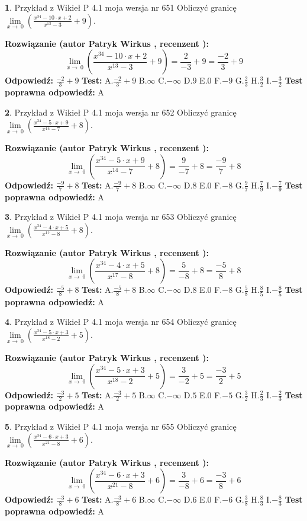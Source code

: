 \documentclass[12pt, a4paper]{article}
\theoremstyle{definition} %
\newtheorem{zad}{}
\newcommand{\zadStart}[1]{\begin{zad}#1\newline}
\newcommand{\zadStop}{\end{zad}}
\newcommand{\rozwStart}[2]{\noindent \textbf{Rozwiązanie (autor #1 , recenzent #2): }\newline}
\newcommand{\rozwStop}{\newline}
\newcommand{\odpStart}{\noindent \textbf{Odpowiedź:}\newline}
\newcommand{\odpStop}{\newline}
\newcommand{\testStart}{\noindent \textbf{Test:}\newline}
\newcommand{\testStop}{\newline}
\newcommand{\kluczStart}{\noindent \textbf{Test poprawna odpowiedź:}\newline}
\newcommand{\kluczStop}{\newline}
\begin{document}
\zadStart{Przykład z Wikieł P 4.1 moja wersja nr 651}
Obliczyć granicę $\lim\limits_{x\to\ 0}(\frac{x^{34}-10 \cdot x +2}{x^{13}-3}+9)$.
\zadStop
\rozwStart{Patryk Wirkus}{}
$$\lim\limits_{x\to\ 0}(\frac{x^{34}-10 \cdot x +2}{x^{13}-3}+9)=\frac{2}{-3}+9=\frac{-2}{3}+9$$
\rozwStop
\odpStart
$\frac{-2}{3}+9$
\odpStop
\testStart
A.$\frac{-2}{3}+9$
B.$\infty$
C.$-\infty$
D.$9$
E.$0$
F.$-9$
G.$\frac{2}{3}$
H.$\frac{3}{2}$
I.$-\frac{3}{2}$
\testStop
\kluczStart
A
\kluczStop



\zadStart{Przykład z Wikieł P 4.1 moja wersja nr 652}
Obliczyć granicę $\lim\limits_{x\to\ 0}(\frac{x^{34}-5 \cdot x +9}{x^{14}-7}+8)$.
\zadStop
\rozwStart{Patryk Wirkus}{}
$$\lim\limits_{x\to\ 0}(\frac{x^{34}-5 \cdot x +9}{x^{14}-7}+8)=\frac{9}{-7}+8=\frac{-9}{7}+8$$
\rozwStop
\odpStart
$\frac{-9}{7}+8$
\odpStop
\testStart
A.$\frac{-9}{7}+8$
B.$\infty$
C.$-\infty$
D.$8$
E.$0$
F.$-8$
G.$\frac{9}{7}$
H.$\frac{7}{9}$
I.$-\frac{7}{9}$
\testStop
\kluczStart
A
\kluczStop



\zadStart{Przykład z Wikieł P 4.1 moja wersja nr 653}
Obliczyć granicę $\lim\limits_{x\to\ 0}(\frac{x^{34}-4 \cdot x +5}{x^{17}-8}+8)$.
\zadStop
\rozwStart{Patryk Wirkus}{}
$$\lim\limits_{x\to\ 0}(\frac{x^{34}-4 \cdot x +5}{x^{17}-8}+8)=\frac{5}{-8}+8=\frac{-5}{8}+8$$
\rozwStop
\odpStart
$\frac{-5}{8}+8$
\odpStop
\testStart
A.$\frac{-5}{8}+8$
B.$\infty$
C.$-\infty$
D.$8$
E.$0$
F.$-8$
G.$\frac{5}{8}$
H.$\frac{8}{5}$
I.$-\frac{8}{5}$
\testStop
\kluczStart
A
\kluczStop



\zadStart{Przykład z Wikieł P 4.1 moja wersja nr 654}
Obliczyć granicę $\lim\limits_{x\to\ 0}(\frac{x^{34}-5 \cdot x +3}{x^{18}-2}+5)$.
\zadStop
\rozwStart{Patryk Wirkus}{}
$$\lim\limits_{x\to\ 0}(\frac{x^{34}-5 \cdot x +3}{x^{18}-2}+5)=\frac{3}{-2}+5=\frac{-3}{2}+5$$
\rozwStop
\odpStart
$\frac{-3}{2}+5$
\odpStop
\testStart
A.$\frac{-3}{2}+5$
B.$\infty$
C.$-\infty$
D.$5$
E.$0$
F.$-5$
G.$\frac{3}{2}$
H.$\frac{2}{3}$
I.$-\frac{2}{3}$
\testStop
\kluczStart
A
\kluczStop



\zadStart{Przykład z Wikieł P 4.1 moja wersja nr 655}
Obliczyć granicę $\lim\limits_{x\to\ 0}(\frac{x^{34}-6 \cdot x +3}{x^{21}-8}+6)$.
\zadStop
\rozwStart{Patryk Wirkus}{}
$$\lim\limits_{x\to\ 0}(\frac{x^{34}-6 \cdot x +3}{x^{21}-8}+6)=\frac{3}{-8}+6=\frac{-3}{8}+6$$
\rozwStop
\odpStart
$\frac{-3}{8}+6$
\odpStop
\testStart
A.$\frac{-3}{8}+6$
B.$\infty$
C.$-\infty$
D.$6$
E.$0$
F.$-6$
G.$\frac{3}{8}$
H.$\frac{8}{3}$
I.$-\frac{8}{3}$
\testStop
\kluczStart
A
\kluczStop
\end{document}
